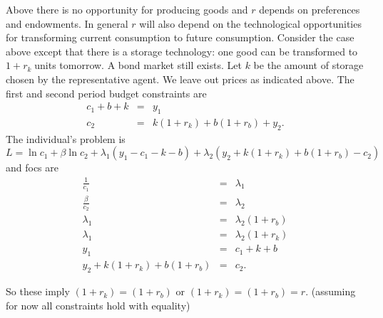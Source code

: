 \documentclass{sebase}
\begin{document}
Above there is no opportunity for producing goods and $r$ depends on
preferences and endowments. In general $r$ will also depend on the
technological opportunities for transforming current consumption to future
consumption. Consider the case above except that there is a storage
technology: one good can be transformed to $1+r_{k}\;$units tomorrow. A bond
market still exists. Let $k$ be the amount of storage chosen by the
representative agent. We leave out prices as indicated above. The first and
second period budget constraints are 
\begin{eqnarray*}
c_{1}+b+k &=&y_{1} \\
c_{2} &=&k\left( 1+r_{k}\right) +b\left( 1+r_{b}\right) +y_{2}.
\end{eqnarray*}%
The individual's problem is%
\begin{equation*}
L=\ln c_{1}+\beta \ln c_{2}+\lambda _{1}\left( y_{1}-c_{1}-k-b\right)
+\lambda _{2}\left( y_{2}+k\left( 1+r_{k}\right) +b\left( 1+r_{b}\right)
-c_{2}\right)
\end{equation*}%
and focs are 
\begin{eqnarray*}
\frac{1}{c_{1}} &=&\lambda _{1} \\
\frac{\beta }{c_{2}} &=&\lambda _{2} \\
\lambda _{1} &=&\lambda _{2}\left( 1+r_{b}\right) \\
\lambda _{1} &=&\lambda _{2}\left( 1+r_{k}\right) \\
y_{1} &=&c_{1}+k+b \\
y_{2}+k\left( 1+r_{k}\right) +b\left( 1+r_{b}\right) &=&c_{2}.
\end{eqnarray*}

\pagebreak

So these imply $\left( 1+r_{k}\right) =\left( 1+r_{b}\right) $ or $\left(
1+r_{k}\right) =\left( 1+r_{b}\right) =r.$ (assuming for now all constraints
hold with equality)
\end{document}
